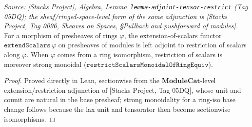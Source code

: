 \begin{lemma}
  \label{lem:extend_scalars_adjunction}
  \textit{Source: [Stacks Project], Algebra, Lemma~\texttt{lemma-adjoint-tensor-restrict}
  (Tag 05DQ); the sheaf/ringed-space-level form of the same adjunction is
  [Stacks Project, Tag 0096, \emph{Sheaves on Spaces}, \S Pullback and pushforward of
  modules].}
  For a morphism of presheaves of rings \(\varphi\), the extension-of-scalars functor
  \(\mathtt{extendScalars}\,\varphi\) on presheaves of modules is left adjoint to
  restriction of scalars along \(\varphi\). When \(\varphi\) comes from a ring
  isomorphism, restriction of scalars is moreover strong monoidal
  (\(\mathtt{restrictScalarsMonoidalOfRingEquiv}\)).
\end{lemma}
\begin{proof}
  Proved directly in Lean, sectionwise from the \(\mathbf{ModuleCat}\)-level
  extension/restriction adjunction of [Stacks Project, Tag 05DQ], whose unit and counit
  are natural in the base presheaf; strong monoidality for a ring-iso base change
  follows because the lax unit and tensorator then become sectionwise isomorphisms.
\end{proof}

